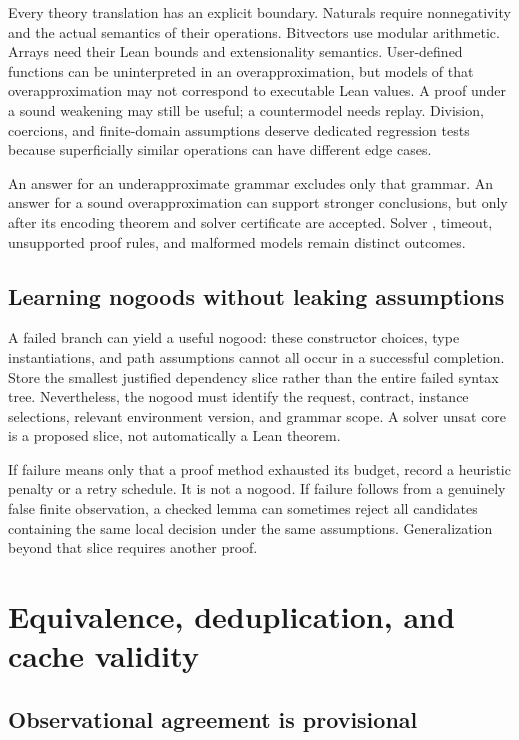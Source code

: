 Every theory translation has an explicit boundary. Naturals require
nonnegativity and the actual semantics of their operations. Bitvectors use
modular arithmetic. Arrays need their Lean bounds and extensionality semantics.
User-defined functions can be uninterpreted in an overapproximation, but models
of that overapproximation may not correspond to executable Lean values. A
proof under a sound weakening may still be useful; a countermodel needs replay.
Division, coercions, and finite-domain assumptions deserve dedicated regression
tests because superficially similar operations can have different edge cases.

An  answer for an underapproximate grammar excludes only that grammar.
An  answer for a sound overapproximation can support stronger
conclusions, but only after its encoding theorem and solver certificate are
accepted. Solver , timeout, unsupported proof rules, and malformed
models remain distinct outcomes.

\subsection{Learning nogoods without leaking assumptions}

A failed branch can yield a useful nogood: these constructor choices, type
instantiations, and path assumptions cannot all occur in a successful
completion. Store the smallest justified dependency slice rather than the
entire failed syntax tree. Nevertheless, the nogood must identify the request,
contract, instance selections, relevant environment version, and grammar scope.
A solver unsat core is a proposed slice, not automatically a Lean theorem.

If failure means only that a proof method exhausted its budget, record a
heuristic penalty or a retry schedule. It is not a nogood. If failure follows
from a genuinely false finite observation, a checked lemma can sometimes reject
all candidates containing the same local decision under the same assumptions.
Generalization beyond that slice requires another proof.

\section{Equivalence, deduplication, and cache validity}\label{sec:equivalence}

\subsection{Observational agreement is provisional}

